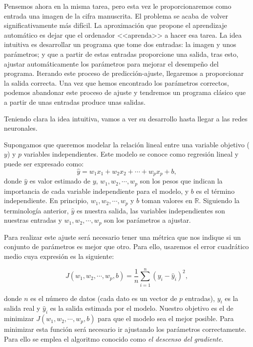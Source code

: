 \documentclass[12pt, a4paper, twoside]{book}
\numberwithin{equation}{section}
\theoremstyle{definition}
\theoremstyle{remark}
\theoremstyle{plain}
\begin{document}
	Pensemos ahora en la 
	misma tarea, pero esta vez le proporcionaremos como entrada una imagen
	de la cifra manuscrita. El problema se acaba de volver 
	significativamente más difícil. La aproximación que propone el 
	aprendizaje automático es dejar que el ordenador <<aprenda>> a hacer 
	esa tarea. La idea intuitiva es desarrollar un programa que tome dos 
	entradas: la imagen y unos parámetros; y que a partir de estas 
	entradas proporcione una salida, tras esto, ajustar automáticamente 
	los parámetros para mejorar el desempeño del programa. Iterando este 
	proceso de predicción-ajuste, llegaremos a proporcionar la salida 
	correcta. Una vez que hemos encontrado los parámetros correctos,
	podemos abandonar este proceso de ajuste y tendremos un 
	programa clásico que a partir de unas entradas produce unas salidas.

	Teniendo clara la idea intuitiva, vamos a ver su desarrollo hasta 
	llegar a las redes neuronales.

	Supongamos que queremos modelar la relación lineal entre una variable
	objetivo ($y$) y $p$ variables independientes. Este modelo se conoce 
	como regresión lineal y puede ser expresado como:
	\begin{equation*}
		\hat{y}=w_{1}x_{1}+w_{2}x_{2}+\cdots+w_{p}x_{p}+b,
	\end{equation*}
	donde $\hat{y}$ es valor estimado de $y$, $w_{1},w_{2},\cdots,w_{p}$ 
	son los pesos que indican la importancia de cada variable 
	independiente para el modelo, y $b$ es el término independiente. En 
	principio, $w_{1},w_{2},\cdots,w_{p}$ y $b$ toman valores en 
	$\mathbb{R}$.
	Siguiendo la terminología anterior, $\hat{y}$ es nuestra salida, las 
	variables independientes son nuestras entradas y $w_{1},w_{2},\cdots,
	w_{p}$ son los parámetros a ajustar. 

	Para realizar este ajuste será necesario tener una métrica que nos 
	indique si un conjunto de parámetros es mejor que otro. Para ello,
	usaremos el error cuadrático medio cuya expresión es la siguiente:

	\begin{equation*}
		J(w_{1},w_{2},\cdots,w_{p},b)=\frac{1}{n}\sum_{i=1}^{n}(y_{i}-\hat{y}_{i})^2,
	\end{equation*}

	\noindent donde $n$ es el número de datos (cada dato es un vector de $p$ 
	entradas), $y_{i}$ es la salida real y 
	$\hat{y}_{i}$ es la salida estimada por el modelo. Nuestro objetivo
	es el de minimizar $J(w_{1},w_{2},\cdots,w_{p},b)$ para que el modelo 
	sea el mejor posible. 
	Para minimizar esta función será necesario ir ajustando los parámetros 
	correctamente. Para ello se emplea el algoritmo conocido como 
	\emph{el descenso del gradiente}.
\end{document}
